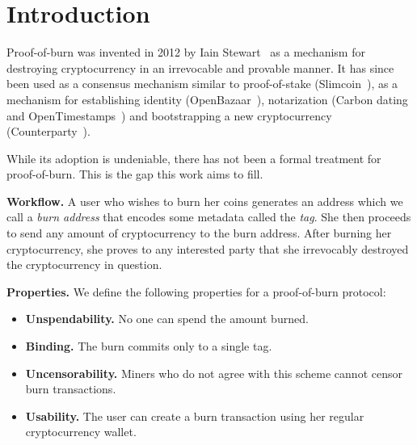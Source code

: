 \section{Introduction}\label{section:introduction}
Proof-of-burn was invented in 2012 by Iain Stewart~\cite{stewart} as a mechanism for destroying cryptocurrency in an irrevocable and provable manner. It has since been used as a consensus mechanism similar to proof-of-stake (Slimcoin~\cite{slimcoin}), as a mechanism for establishing identity (OpenBazaar~\cite{zindros2016trust}), notarization (Carbon dating~\cite{clark2012commitcoin} and OpenTimestamps~\cite{todd2016opentimestamps}) and bootstrapping a new cryptocurrency (Counterparty~\cite{counterparty}).

While its adoption is undeniable, there has not been a formal treatment for proof-of-burn. This is the gap this work aims to fill.

\noindent
\textbf{Workflow.}
A user who wishes to burn her coins generates an address which we call a \emph{burn address} that encodes some metadata called the \emph{tag}. She then proceeds to send any amount of cryptocurrency to the burn address. After burning her cryptocurrency, she proves to any interested party that she irrevocably destroyed the cryptocurrency in question.

\noindent
\textbf{Properties.}
We define the following properties for a proof-of-burn protocol:
\begin{itemize}
    \item \textbf{Unspendability.} No one can spend the amount burned.
    \item \textbf{Binding.} The burn commits only to a single tag.
    \item \textbf{Uncensorability.} Miners who do not agree with this scheme cannot censor burn transactions.
    \item \textbf{Usability.} The user can create a burn transaction using her regular cryptocurrency wallet.
\end{itemize}

